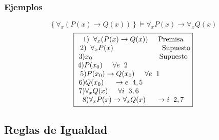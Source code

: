\subsubsection{Ejemplos}
\[\left \{ \forall_x(P(x)\rightarrow Q(x)) \right \}
        \models \forall_x P(x) \rightarrow \forall_xQ(x)
\]
\[
        \boxed{\begin{matrix}
                        1)\hspace{2mm} \forall_x(P(x)\rightarrow Q(x)) \hspace{5mm} \text{Premisa}             \\
                        \hspace{2mm}2)\hspace{2mm} \forall_x P(x) \hspace{24mm} \text{Supuesto}                \\
                        3) x_0 \hspace{33mm} \text{Supuesto}                                                   \\
                        \hspace{-30mm}4)P(x_0) \hspace{5mm} \forall e \hspace{2mm} 2                           \\
                        \hspace{-13mm}5)P(x_0) \rightarrow Q(x_0)\hspace{5mm} \forall e \hspace{2mm} 1         \\
                        \hspace{-22mm}6)Q(x_0) \hspace{5mm} \rightarrow e \hspace{2mm} 4,5                     \\
                        \hspace{-24mm}7)\forall_x Q(x)\hspace{5mm} \forall i \hspace{2mm} 3,6                  \\
                        8) \forall_xP(x) \rightarrow \forall_xQ(x) \hspace{5mm} \rightarrow i \hspace{2mm} 2,7 \\
                \end{matrix}}
\]
\subsection{Reglas de Igualdad}